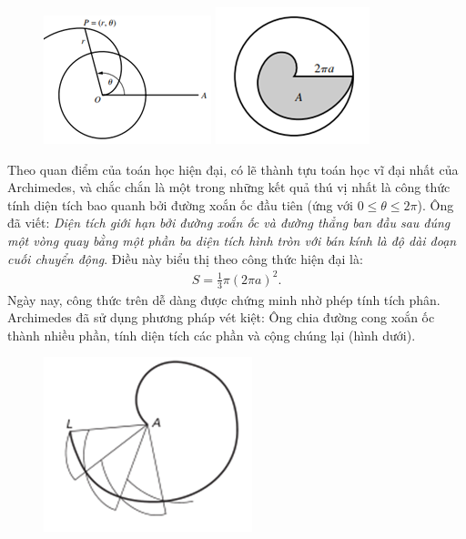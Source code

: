 \begin{multicols}{2}
	\begin{figure}[H]
		\vspace*{-5pt}
		\centering
		\captionsetup{labelformat= empty, justification=centering}
		\includegraphics[height=0.4\linewidth]{7a}
		\includegraphics[height=0.4\linewidth]{7b}
	\end{figure}
	Theo quan điểm của toán học hiện đại, có lẽ thành tựu toán học vĩ đại nhất của Archimedes, và chắc chắn là một trong những kết quả thú vị nhất là công thức tính diện tích bao quanh bởi đường xoắn ốc đầu tiên (ứng với $0 \le \theta  \le 2\pi $). Ông đã viết: \textit{Diện tích giới hạn bởi đường xoắn ốc và đường thẳng ban đầu sau đúng một vòng quay bằng một phần ba diện tích hình tròn với bán kính là độ dài đoạn cuối chuyển động}. Điều này biểu thị theo công thức hiện đại là:  
	\begin{align*}
		S = \frac{1}{3}\pi {\left( {2\pi a} \right)^2}.
	\end{align*}
	Ngày nay, công thức trên dễ dàng được chứng minh nhờ phép tính tích phân. Archimedes đã sử dụng phương pháp vét kiệt: Ông chia đường cong xoắn ốc thành nhiều phần, tính diện tích các phần và cộng chúng lại (hình dưới).
	\begin{figure}[H]
		\vspace*{-5pt}
		\centering
		\captionsetup{labelformat= empty, justification=centering}
		\includegraphics[width= 0.65\linewidth]{8}

\end{figure}
\end{multicols}
